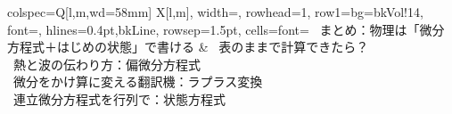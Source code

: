 \begin{longtblr}{colspec={Q[l,m,wd=58mm] X[l,m]}, width=\linewidth, rowhead=1, row{1}={bg=bkVol!14, font=\sffamily\bfseries\footnotesize},
  hlines={0.4pt,bkLine}, rowsep=1.5pt, cells={font=\footnotesize}}
{\ まとめ：物理は「微分方程式＋はじめの状態」で書ける} & {\ 表のままで計算できたら？\\ \ 熱と波の伝わり方：偏微分方程式\\ \ 微分をかけ算に変える翻訳機：ラプラス変換\\ \ 連立微分方程式を行列で：状態方程式} \\
\end{longtblr}
